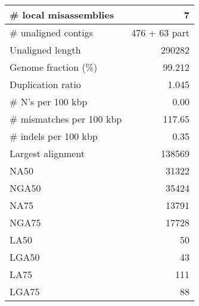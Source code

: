 \documentclass[12pt,a4paper]{article}
\begin{document}
\begin{table}[ht]
\begin{center}
\begin{tabular}{|l*{1}{|r}|}
\# local misassemblies & 7 \\ \hline
\# unaligned contigs & 476 + 63 part \\ \hline
Unaligned length & 290282 \\ \hline
Genome fraction (\%) & 99.212 \\ \hline
Duplication ratio & 1.045 \\ \hline
\# N's per 100 kbp & 0.00 \\ \hline
\# mismatches per 100 kbp & 117.65 \\ \hline
\# indels per 100 kbp & 0.35 \\ \hline
Largest alignment & 138569 \\ \hline
NA50 & 31322 \\ \hline
NGA50 & 35424 \\ \hline
NA75 & 13791 \\ \hline
NGA75 & 17728 \\ \hline
LA50 & 50 \\ \hline
LGA50 & 43 \\ \hline
LA75 & 111 \\ \hline
LGA75 & 88 \\ \hline
\end{tabular}
\end{center}
\end{table}
\end{document}
